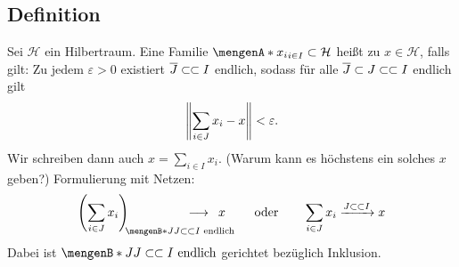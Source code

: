 \subsection[Definition: Summierbare Familie (in einem Hilbertraum)]{Definition} %
\label{sub:716}
Sei $\mathcal{H}$ ein Hilbertraum. Eine Familie $\set{x_i}_{i \in I} \subset \mathcal{H}$ heißt  zu $x \in \mathcal{H}$, falls gilt: 
Zu jedem $\varepsilon>0$ existiert $\overline{J} \subset\mkern-0.7mu \subset I$ endlich, sodass für alle $\overline{J} \subset J \subset\mkern-0.7mu \subset I$ endlich gilt 
\[
	\norm{\sum_{i \in J}x_i - x } < \varepsilon.
\]
Wir schreiben dann auch $x= \sum_{i \in I} x_i$. (Warum kann es höchstens ein solches $x$ geben?) Formulierung mit Netzen: 
\[
	\enbrace*{\sum_{i \in J} x_i}_{\!\!\set[J]{J \finSub I \text{ endlich}}} \hspace{-4em} \longrightarrow \enspace x \qquad \text{ oder} \qquad \sum_{i \in J}x_i \xrightarrow{J \finSub I} x 
\]
Dabei ist $\set[J]{J \finSub I \text{ endlich}}$ gerichtet bezüglich Inklusion.

